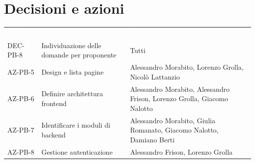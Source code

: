 \documentclass[a4paper, 11pt]{article}
\begin{document}
\section{Decisioni e azioni} \label{DecisioniAzioni}
\begin{center}
    \begin{tabular}{>{\centering\arraybackslash}m{3cm} >{\raggedright\arraybackslash}p{5.5cm} >{\centering\arraybackslash}p{4cm}}
        \rowcolor{AccentColor}
        \textcolor{white}{\textbf{Codice }} & 
        \multicolumn{1}{c}{\textcolor{white}{\textbf{Descrizione}}} & 
        \textcolor{white}{\textbf{Assegnatario}} \\
		DEC-PB-8 & Individuazione delle domande per proponente & Tutti\\
        \midrule
        AZ-PB-5 & Design e lista pagine & Alessandro Morabito, Lorenzo Grolla, Nicolò Lattanzio\\
        AZ-PB-6 & Definire architettura frontend & Alessandro Morabito, Alessandro Frison, Lorenzo Grolla, Giacomo Nalotto\\
        AZ-PB-7 & Identificare i moduli di backend & Alessandro Morabito, Giulia Romanato, Giacomo Nalotto, Damiano Berti\\
        AZ-PB-8 & Gestione autenticazione & Alessandro Frison, Lorenzo Grolla\\
    \end{tabular}
\end{center}
\end{document}
